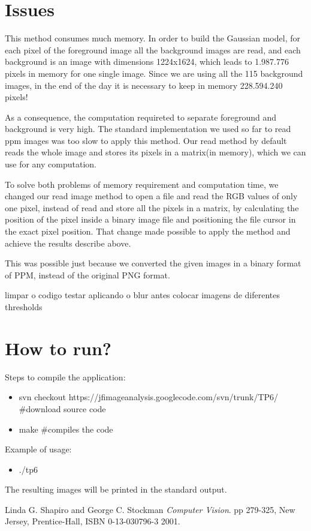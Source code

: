 \documentclass{article}
\begin{document}
\section{Issues}
	This method consumes much memory. In order to build the Gaussian model, for each pixel of the foreground image all the background images are read, and each background is an image with dimensions 1224x1624, which leads to 1.987.776 pixels in memory for one single image. Since we are using all the 115 background images, in the end of the day it is necessary to keep in memory 228.594.240 pixels!

	As a consequence, the computation requireted to separate foreground and background is very high. The standard implementation we used so far to read ppm images was too slow to apply this method. Our read method by default reads the whole image and stores its pixels in a matrix(in memory), which we can use for any computation.

	To solve both problems of memory requirement and computation time, we changed our read image method to open a file and read the RGB values of only one pixel, instead of read and store all the pixels in a matrix, by calculating the position of the pixel inside a binary image file and positioning the file cursor in the exact pixel position. That change made possible to apply the method and achieve the results describe above.

	This was possible just because we converted the given images in a binary format of PPM, instead of the original PNG format.

	limpar o codigo
	testar aplicando o blur antes
	colocar imagens de diferentes thresholds


\section{How to run?}

	Steps to compile the application:
	
	\begin{itemize}
		\item svn checkout https://jfimageanalysis.googlecode.com/svn/trunk/TP6/ \#download source code
		\item make \#compiles the code
	\end{itemize}


	Example of usage:

	\begin{itemize}
		\item ./tp6
	\end{itemize}

	The resulting images will be printed in the standard output.


\begin{thebibliography}{9}

	Linda G. Shapiro and George C. Stockman
 	\emph{Computer Vision}.
	pp 279-325, 
	New Jersey, Prentice-Hall, 
	ISBN 0-13-030796-3
 	2001.

\end{thebibliography}
\end{document}
